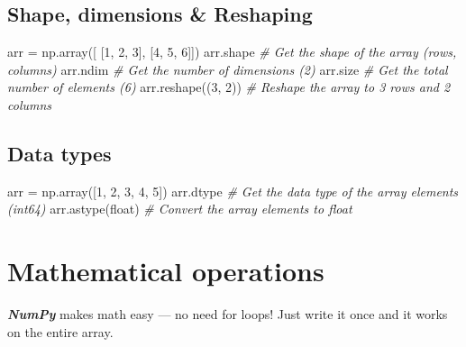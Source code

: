 \documentclass[11pt]{article}
\newenvironment{Shaded}{}{}
\newcommand{\DecValTok}[1]{\textcolor[rgb]{0.25,0.63,0.44}{{#1}}}
\newcommand{\CommentTok}[1]{\textcolor[rgb]{0.38,0.63,0.69}{\textit{{#1}}}}
\newcommand{\NormalTok}[1]{{#1}}
\newcommand{\OperatorTok}[1]{\textcolor[rgb]{0.40,0.40,0.40}{{#1}}}
\newcommand{\BuiltInTok}[1]{{#1}}
\begin{document}
\subsection{\texorpdfstring{{Shape, dimensions \&
Reshaping}}{Shape, dimensions \& Reshaping}}\label{shape-dimensions-reshaping}

\begin{Shaded}
\begin{Highlighting}[]
\NormalTok{    arr }\OperatorTok{=}\NormalTok{ np.array([}
\NormalTok{        [}\DecValTok{1}\NormalTok{, }\DecValTok{2}\NormalTok{, }\DecValTok{3}\NormalTok{], }
\NormalTok{        [}\DecValTok{4}\NormalTok{, }\DecValTok{5}\NormalTok{, }\DecValTok{6}\NormalTok{]])}
\NormalTok{    arr.shape    }\CommentTok{\# Get the shape of the array (rows, columns)}
\NormalTok{    arr.ndim     }\CommentTok{\# Get the number of dimensions (2)}
\NormalTok{    arr.size     }\CommentTok{\# Get the total number of elements (6)}
\NormalTok{    arr.reshape((}\DecValTok{3}\NormalTok{, }\DecValTok{2}\NormalTok{))  }\CommentTok{\# Reshape the array to 3 rows and 2 columns}
\end{Highlighting}
\end{Shaded}

\subsection{\texorpdfstring{{Data types}}{Data types}}\label{data-types}

\begin{Shaded}
\begin{Highlighting}[]
\NormalTok{    arr }\OperatorTok{=}\NormalTok{ np.array([}\DecValTok{1}\NormalTok{, }\DecValTok{2}\NormalTok{, }\DecValTok{3}\NormalTok{, }\DecValTok{4}\NormalTok{, }\DecValTok{5}\NormalTok{])}
\NormalTok{    arr.dtype    }\CommentTok{\# Get the data type of the array elements (int64)}
\NormalTok{    arr.astype(}\BuiltInTok{float}\NormalTok{)  }\CommentTok{\# Convert the array elements to float}
\end{Highlighting}
\end{Shaded}

\section{\texorpdfstring{{Mathematical
operations}}{Mathematical operations}}\label{mathematical-operations}

\textbf{\emph{NumPy}} makes math easy --- no need for loops! Just write
it once and it works on the entire array.
\end{document}
